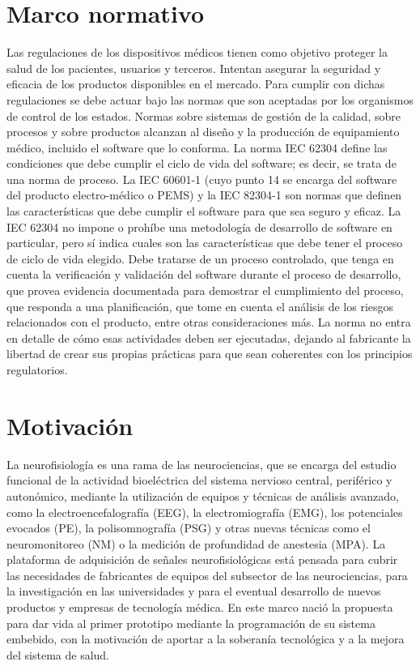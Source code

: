 \section{Marco normativo}
Las regulaciones de los dispositivos médicos tienen como objetivo proteger la salud de los pacientes, usuarios y terceros. Intentan asegurar la seguridad y eficacia de los productos disponibles en el mercado. Para cumplir con dichas regulaciones se debe actuar bajo las normas que son aceptadas por los organismos de control de los estados. Normas sobre sistemas de gestión de la calidad, sobre procesos y sobre productos alcanzan al diseño y la producción de equipamiento médico, incluido el software que lo conforma. La norma IEC 62304 \citep{NORMA:62304} define las condiciones que debe cumplir el ciclo de vida del software; es decir, se trata de una norma de proceso. La IEC 60601-1 \citep{NORMA:60601} (cuyo punto 14 se encarga del software del producto electro-médico o PEMS) y la IEC 82304-1 \citep{NORMA:82304} son normas que definen las características que debe cumplir el software para que sea seguro y eficaz. La IEC 62304 no impone o prohíbe una metodología de desarrollo de software en particular, pero sí indica cuales son las características que debe tener el proceso de ciclo de vida elegido. Debe tratarse de un proceso controlado, que tenga en cuenta la verificación y validación del software durante el proceso de desarrollo, que provea evidencia documentada para demostrar el cumplimiento del proceso, que responda a una planificación, que tome en cuenta el análisis de los riesgos relacionados con el producto, entre otras consideraciones más. La norma no entra en detalle de cómo esas actividades deben ser ejecutadas, dejando al fabricante la libertad de crear sus propias prácticas para que sean coherentes con los principios regulatorios.

\section{Motivación}
La neurofisiología es una rama de las neurociencias, que se encarga del estudio funcional de la actividad bioeléctrica del sistema nervioso central, periférico y autonómico, mediante la utilización de equipos y técnicas de análisis avanzado, como la electroencefalografía (EEG), la electromiografía (EMG), los potenciales evocados (PE), la polisomnografía (PSG) y otras nuevas técnicas como el neuromonitoreo (NM) o la medición de profundidad de anestesia (MPA). La plataforma de adquisición de señales neurofisiológicas está pensada para cubrir las necesidades de fabricantes de equipos del subsector de las neurociencias, para la investigación en las universidades y para el eventual desarrollo de nuevos productos y empresas de tecnología médica. En este marco nació la propuesta para dar vida al primer prototipo mediante la programación de su sistema embebido, con la motivación de aportar a la soberanía tecnológica y a la mejora del sistema de salud. 

